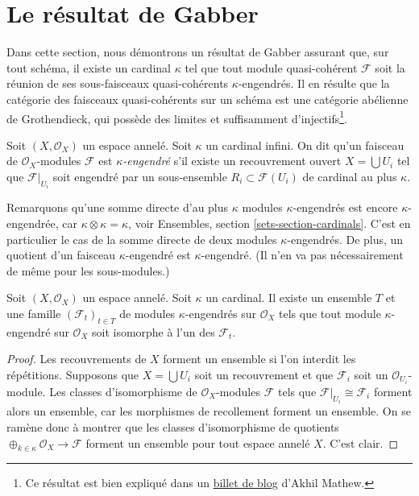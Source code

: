 \section{Le résultat de Gabber}
\label{section-gabber}

\noindent
Dans cette section, nous démontrons un résultat de Gabber assurant que, sur
tout schéma, il existe un cardinal $\kappa$ tel que tout module
quasi-cohérent $\mathcal{F}$ soit la réunion de ses sous-faisceaux quasi-cohérents
$\kappa$-engendrés. Il en résulte que la catégorie des faisceaux quasi-cohérents sur un
schéma est une catégorie abélienne de Grothendieck, qui possède des
limites et suffisamment d'injectifs\footnote{Ce résultat est bien expliqué dans un
\href{https://amathew.wordpress.com/2011/07/30/quasi-coherent-sheaves-presentable-categories-and-a-result-of-gabber/}{billet de blog}
d'Akhil Mathew.}.

\begin{definition}
\label{definition-kappa-generated}
Soit $(X, \mathcal{O}_X)$ un espace annelé. Soit $\kappa$ un cardinal
infini. On dit qu'un faisceau de $\mathcal{O}_X$-modules $\mathcal{F}$ est
{\it $\kappa$-engendré} s'il existe un recouvrement ouvert
$X = \bigcup U_i$ tel que $\mathcal{F}|_{U_i}$ soit engendré par un
sous-ensemble $R_i \subset \mathcal{F}(U_i)$ de cardinal au
plus $\kappa$.
\end{definition}

\noindent
Remarquons qu'une somme directe d'au plus $\kappa$ modules $\kappa$-engendrés est
encore $\kappa$-engendrée, car $\kappa \otimes \kappa = \kappa$, voir
Ensembles, section \ref{sets-section-cardinals}.
C'est en particulier le cas de la somme directe de deux modules $\kappa$-engendrés. De plus,
un quotient d'un faisceau $\kappa$-engendré est $\kappa$-engendré. (Il
n'en va pas nécessairement de même pour les sous-modules.)

\begin{lemma}
\label{lemma-set-of-iso-classes}
Soit $(X, \mathcal{O}_X)$ un espace annelé. Soit $\kappa$ un cardinal. Il
existe un ensemble $T$ et une famille $(\mathcal{F}_t)_{t \in T}$ de modules
$\kappa$-engendrés sur $\mathcal{O}_X$ tels que tout module $\kappa$-engendré sur
$\mathcal{O}_X$ soit isomorphe à l'un des $\mathcal{F}_t$.
\end{lemma}

\begin{proof}
Les recouvrements de $X$ forment un ensemble si l'on interdit les répétitions.
Supposons que $X = \bigcup U_i$ soit un recouvrement et que $\mathcal{F}_i$
soit un $\mathcal{O}_{U_i}$-module. Les classes
d'isomorphisme de $\mathcal{O}_X$-modules $\mathcal{F}$ tels
que $\mathcal{F}|_{U_i} \cong \mathcal{F}_i$ forment alors un ensemble, car
les morphismes de recollement forment un ensemble. On se ramène donc à montrer que les classes
d'isomorphisme de quotients
$\oplus_{k \in \kappa} \mathcal{O}_X \to \mathcal{F}$
forment un ensemble pour tout espace annelé $X$. C'est clair.
\end{proof}

